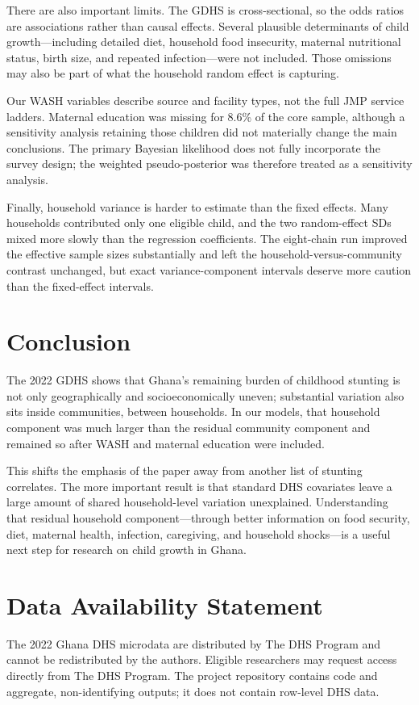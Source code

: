 \documentclass[11pt]{article}
\begin{document}
There are also important limits. The GDHS is cross-sectional, so the odds ratios are associations rather than causal effects. Several plausible determinants of child growth---including detailed diet, household food insecurity, maternal nutritional status, birth size, and repeated infection---were not included. Those omissions may also be part of what the household random effect is capturing.

Our WASH variables describe source and facility types, not the full JMP service ladders. Maternal education was missing for 8.6\% of the core sample, although a sensitivity analysis retaining those children did not materially change the main conclusions. The primary Bayesian likelihood does not fully incorporate the survey design; the weighted pseudo-posterior was therefore treated as a sensitivity analysis.

Finally, household variance is harder to estimate than the fixed effects. Many households contributed only one eligible child, and the two random-effect SDs mixed more slowly than the regression coefficients. The eight-chain run improved the effective sample sizes substantially and left the household-versus-community contrast unchanged, but exact variance-component intervals deserve more caution than the fixed-effect intervals.

\section{Conclusion}

The 2022 GDHS shows that Ghana's remaining burden of childhood stunting is not only geographically and socioeconomically uneven; substantial variation also sits inside communities, between households. In our models, that household component was much larger than the residual community component and remained so after WASH and maternal education were included.

This shifts the emphasis of the paper away from another list of stunting correlates. The more important result is that standard DHS covariates leave a large amount of shared household-level variation unexplained. Understanding that residual household component---through better information on food security, diet, maternal health, infection, caregiving, and household shocks---is a useful next step for research on child growth in Ghana.


\section*{Data Availability Statement}
The 2022 Ghana DHS microdata are distributed by The DHS Program and cannot be redistributed by the authors. Eligible researchers may request access directly from The DHS Program. The project repository contains code and aggregate, non-identifying outputs; it does not contain row-level DHS data.




\end{document}
